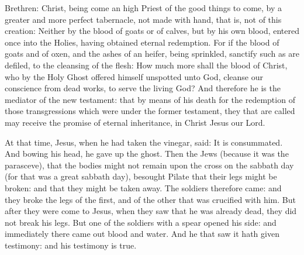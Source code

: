 

\bigskip




Brethren: Christ, being come an high Priest of the good things to come,
by a greater and more perfect tabernacle, not made with hand, that is,
not of this creation:
Neither by the blood of goats or of calves, but by his own blood,
entered once into the Holies, having obtained eternal redemption.
For if the blood of goats and of oxen, and the ashes of an heifer,
being sprinkled, sanctify such as are defiled, to the cleansing of the
flesh:
How much more shall the blood of Christ, who by the Holy Ghost
offered himself unspotted unto God, cleanse our conscience from dead
works, to serve the living God?
And therefore he is the mediator of the new testament: that by
means of his death for the redemption of those transgressions which were
under the former testament, they that are called may receive the promise
of eternal inheritance, in Christ Jesus our Lord.

\medskip


At that time, Jesus, when he had taken the vinegar, said: It is
consummated. And bowing his head, he gave up the ghost.
Then the Jews (because it was the parasceve), that the bodies
might not remain upon the cross on the sabbath day (for that was a great
sabbath day), besought Pilate that their legs might be broken: and that
they might be taken away.
The soldiers therefore came: and they broke the legs of the
first, and of the other that was crucified with him.
But after they were come to Jesus, when they saw that he was
already dead, they did not break his legs.
But one of the soldiers with a spear opened his side: and
immediately there came out blood and water.
And he that saw it hath given testimony: and his testimony is
true. 

\bigskip




